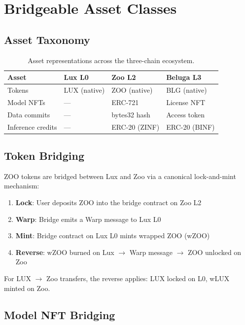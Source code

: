 \section{Bridgeable Asset Classes}

\label{sec:assets}

\subsection{Asset Taxonomy}

\begin{table}[t]
\centering
\begin{tabular}{llll}
\toprule
\textbf{Asset} & \textbf{Lux L0} & \textbf{Zoo L2} & \textbf{Beluga L3} \\
\midrule
Tokens & LUX (native) & ZOO (native) & BLG (native) \\
Model NFTs & --- & ERC-721 & License NFT \\
Data commits & --- & bytes32 hash & Access token \\
Inference credits & --- & ERC-20 (ZINF) & ERC-20 (BINF) \\
\bottomrule
\end{tabular}
\caption{Asset representations across the three-chain ecosystem.}
\label{tab:assets}
\end{table}

\subsection{Token Bridging}

ZOO tokens are bridged between Lux and Zoo via a canonical lock-and-mint mechanism:

\begin{enumerate}
    \item \textbf{Lock}: User deposits ZOO into the bridge contract on Zoo L2
    \item \textbf{Warp}: Bridge emits a Warp message to Lux L0
    \item \textbf{Mint}: Bridge contract on Lux L0 mints wrapped ZOO (wZOO)
    \item \textbf{Reverse}: wZOO burned on Lux $\to$ Warp message $\to$ ZOO unlocked on Zoo
\end{enumerate}

For LUX $\to$ Zoo transfers, the reverse applies: LUX locked on L0, wLUX minted on Zoo.

\subsection{Model NFT Bridging}

